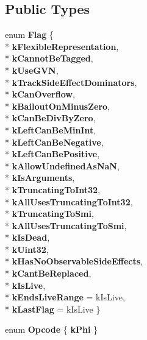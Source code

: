 \subsection*{Public Types}
\begin{DoxyCompactItemize}
\item 
enum {\bfseries Flag} \{ \\*
{\bfseries k\+Flexible\+Representation}, 
\\*
{\bfseries k\+Cannot\+Be\+Tagged}, 
\\*
{\bfseries k\+Use\+G\+VN}, 
\\*
{\bfseries k\+Track\+Side\+Effect\+Dominators}, 
\\*
{\bfseries k\+Can\+Overflow}, 
\\*
{\bfseries k\+Bailout\+On\+Minus\+Zero}, 
\\*
{\bfseries k\+Can\+Be\+Div\+By\+Zero}, 
\\*
{\bfseries k\+Left\+Can\+Be\+Min\+Int}, 
\\*
{\bfseries k\+Left\+Can\+Be\+Negative}, 
\\*
{\bfseries k\+Left\+Can\+Be\+Positive}, 
\\*
{\bfseries k\+Allow\+Undefined\+As\+NaN}, 
\\*
{\bfseries k\+Is\+Arguments}, 
\\*
{\bfseries k\+Truncating\+To\+Int32}, 
\\*
{\bfseries k\+All\+Uses\+Truncating\+To\+Int32}, 
\\*
{\bfseries k\+Truncating\+To\+Smi}, 
\\*
{\bfseries k\+All\+Uses\+Truncating\+To\+Smi}, 
\\*
{\bfseries k\+Is\+Dead}, 
\\*
{\bfseries k\+Uint32}, 
\\*
{\bfseries k\+Has\+No\+Observable\+Side\+Effects}, 
\\*
{\bfseries k\+Cant\+Be\+Replaced}, 
\\*
{\bfseries k\+Is\+Live}, 
\\*
{\bfseries k\+Ends\+Live\+Range} = k\+Is\+Live, 
\\*
{\bfseries k\+Last\+Flag} = k\+Is\+Live
 \}\hypertarget{classv8_1_1internal_1_1_h_value_ad61d5dfb56d945f1ef7f245f78e9246b}{}\label{classv8_1_1internal_1_1_h_value_ad61d5dfb56d945f1ef7f245f78e9246b}

\item 
enum {\bfseries Opcode} \{ {\bfseries k\+Phi}
 \}\hypertarget{classv8_1_1internal_1_1_h_value_a823095afb3b6ca876edd3a259ff4088b}{}\label{classv8_1_1internal_1_1_h_value_a823095afb3b6ca876edd3a259ff4088b}

\end{DoxyCompactItemize}
